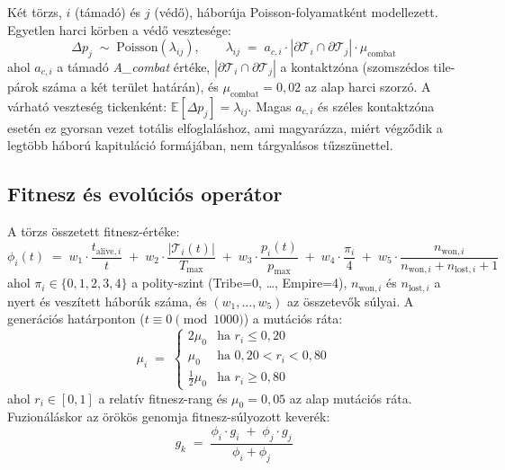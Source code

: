 Két törzs, $i$ (támadó) és $j$ (védő), háborúja Poisson-folyamatként modellezett.
Egyetlen harci körben a védő vesztesége:
\begin{equation}
\Delta p_j \;\sim\; \mathrm{Poisson}(\lambda_{ij}), \qquad
\lambda_{ij} \;=\; a_{c,i}\cdot|\partial\mathcal{T}_i \cap \partial\mathcal{T}_j|\cdot\mu_{\text{combat}}
\end{equation}
ahol $a_{c,i}$ a támadó \textit{A\_combat} értéke, $|\partial\mathcal{T}_i \cap \partial\mathcal{T}_j|$
a kontaktzóna (szomszédos tile-párok száma a két terület határán), és $\mu_{\text{combat}} = 0{,}02$
az alap harci szorzó. A várható veszteség tickenként: $\mathbb{E}[\Delta p_j] = \lambda_{ij}$.
Magas $a_{c,i}$ és széles kontaktzóna esetén ez gyorsan vezet totális elfoglaláshoz, ami
magyarázza, miért végződik a legtöbb háború kapituláció formájában, nem tárgyalásos tűzszünettel.

\subsection*{Fitnesz és evolúciós operátor}

A törzs összetett fitnesz-értéke:
\begin{equation}
\phi_i(t) \;=\; w_1\cdot\frac{t_{\text{alive},i}}{t} \;+\; w_2\cdot\frac{|\mathcal{T}_i(t)|}{T_{\max}} \;+\; w_3\cdot\frac{p_i(t)}{p_{\max}} \;+\; w_4\cdot\frac{\pi_i}{4} \;+\; w_5\cdot\frac{n_{\text{won},i}}{n_{\text{won},i}+n_{\text{lost},i}+1}
\end{equation}
ahol $\pi_i \in \{0,1,2,3,4\}$ a polity-szint (Tribe=0, \ldots, Empire=4), $n_{\text{won},i}$
és $n_{\text{lost},i}$ a nyert és veszített háborúk száma, és $(w_1,\ldots,w_5)$ az összetevők
súlyai. A generációs határponton ($t \equiv 0 \pmod{1000}$) a mutációs ráta:
\begin{equation}
\mu_i \;=\;
\begin{cases}
2\mu_0 & \text{ha } r_i \leq 0{,}20 \\
\mu_0  & \text{ha } 0{,}20 < r_i < 0{,}80 \\
\tfrac{1}{2}\mu_0 & \text{ha } r_i \geq 0{,}80
\end{cases}
\end{equation}
ahol $r_i \in [0,1]$ a relatív fitnesz-rang és $\mu_0 = 0{,}05$ az alap mutációs ráta.
Fuzionáláskor az örökös genomja fitnesz-súlyozott keverék:
\begin{equation}
g_k \;=\; \frac{\phi_i\cdot g_i \;+\; \phi_j\cdot g_j}{\phi_i + \phi_j}
\end{equation}

